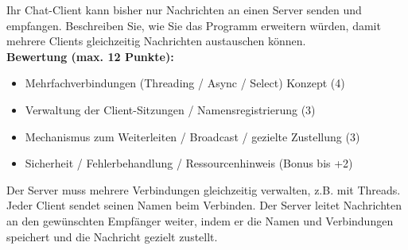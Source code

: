 \begin{myexercise}\label{ex:erweiterungClient}

    Ihr Chat-Client kann bisher nur Nachrichten an einen Server senden und empfangen. Beschreiben Sie, wie Sie das Programm erweitern würden, damit mehrere Clients gleichzeitig Nachrichten austauschen können.
    \\[.5cm]
    \textbf{Bewertung (max. 12 Punkte):}
    \begin{itemize}
        \item Mehrfachverbindungen (Threading / Async / Select) Konzept (4)
        \item Verwaltung der Client-Sitzungen / Namensregistrierung (3)
        \item Mechanismus zum Weiterleiten / Broadcast / gezielte Zustellung (3)
        \item Sicherheit / Fehlerbehandlung / Ressourcenhinweis (Bonus bis +2)
    \end{itemize}

    \begin{myanswer}
        Der Server muss mehrere Verbindungen gleichzeitig verwalten, z.B. mit Threads. Jeder Client sendet seinen Namen beim Verbinden. Der Server leitet Nachrichten an den gewünschten Empfänger weiter, indem er die Namen und Verbindungen speichert und die Nachricht gezielt zustellt.
    \end{myanswer}
\end{myexercise}
\newpage
